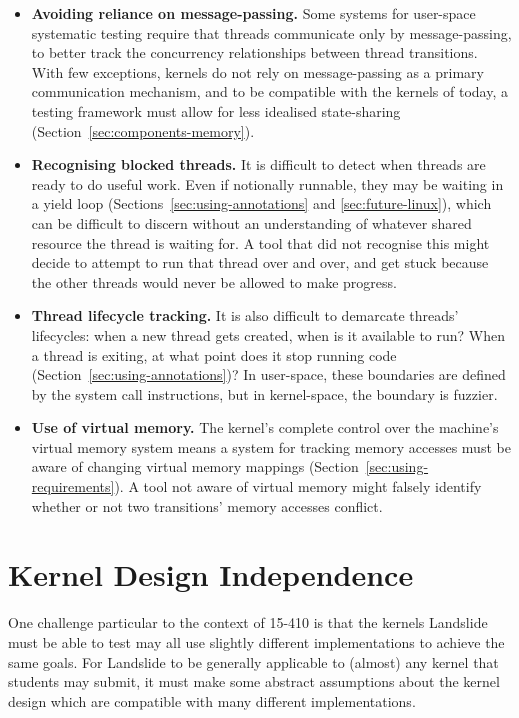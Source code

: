 \begin{itemize}
	\item {\bf Avoiding reliance on message-passing.} Some systems for user-space systematic testing require that threads communicate only by message-passing, to better track the concurrency relationships between thread transitions\cite{dbug-ssv}. With few exceptions\cite{barrelfish}, kernels do not rely on message-passing as a primary communication mechanism, and to be compatible with the kernels of today, a testing framework must allow for less idealised state-sharing (Section~\ref{sec:components-memory}).
	\item {\bf Recognising blocked threads.} It is difficult to detect when threads are ready to do useful work. Even if notionally runnable, they may be waiting in a yield loop (Sections~\ref{sec:using-annotations} and \ref{sec:future-linux}), which can be difficult to discern without an understanding of whatever shared resource the thread is waiting for. A tool that did not recognise this might decide to attempt to run that thread over and over, and get stuck because the other threads would never be allowed to make progress.
	\item {\bf Thread lifecycle tracking.} It is also difficult to demarcate threads' lifecycles: when a new thread gets created, when is it available to run? When a thread is exiting, at what point does it stop running code (Section~\ref{sec:using-annotations})? In user-space, these boundaries are defined by the system call instructions, but in kernel-space, the boundary is fuzzier.
	\item {\bf Use of virtual memory.} The kernel's complete control over the machine's virtual memory system means a system for tracking memory accesses must be aware of changing virtual memory mappings (Section~\ref{sec:using-requirements}). A tool not aware of virtual memory might falsely identify whether or not two transitions' memory accesses conflict.
\end{itemize}

\section{Kernel Design Independence}
\label{sec:challenges-design}

One challenge particular to the context of 15-410 is that the kernels Landslide must be able to test may all use slightly different implementations to achieve the same goals. For Landslide to be generally applicable to (almost) any kernel that students may submit, it must make some abstract assumptions about the kernel design which are compatible with many different implementations.

